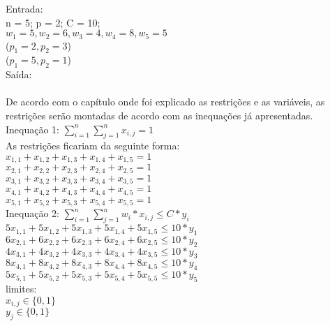     \noindent Entrada:\\
      \indent n = 5; p = 2; C = 10;\\
      \indent \(w_{1} = 5, w_{2} = 6, w_{3} = 4, w_{4} = 8, w_{5} = 5\)\\
      \indent (\(p_{1} = 2, p_{2} = 3\))\\
      \indent (\(p_{1} = 5, p_{2} = 1\))\\
    \noindent Saída:\\
        \\

       De acordo com o capítulo onde foi explicado as restrições e as variáveis, as restrições serão montadas de acordo com as inequações já apresentadas. \\

      \noindent Inequação 1: \( \sum_{i=1}^{n} \sum_{j=1}^{n} x_{i,j} = 1\) \\
        \noindent As restrições ficariam da seguinte forma:\\
        \indent \( x_{1,1} + x_{1,2} + x_{1,3} + x_{1,4} + x_{1,5} = 1 \)\\
        \indent \( x_{2,1} + x_{2,2} + x_{2,3} + x_{2,4} + x_{2,5} = 1\)\\
        \indent \( x_{3,1} + x_{3,2} + x_{3,3} + x_{3,4} + x_{3,5} = 1 \)\\
        \indent \( x_{4,1} + x_{4,2} + x_{4,3} + x_{4,4} + x_{4,5} = 1 \)\\
        \indent \( x_{5,1} + x_{5,2} + x_{5,3} + x_{5,4} + x_{5,5} = 1 \)\\

      \noindent Inequação 2: \( \sum_{i=1}^{n} \sum_{j=1}^{n} w_{i}*x_{i,j} \leq C*y_{i}\) \\
        \indent \( 5x_{1,1} + 5x_{1,2} + 5x_{1,3} + 5x_{1,4} + 5x_{1,5} \leq 10*y_{1} \)\\
        \indent \( 6x_{2,1} + 6x_{2,2} + 6x_{2,3} + 6x_{2,4} + 6x_{2,5} \leq 10*y_{2} \)\\
        \indent \( 4x_{3,1} + 4x_{3,2} + 4x_{3,3} + 4x_{3,4} + 4x_{3,5} \leq 10*y_{3} \)\\
        \indent \( 8x_{4,1} + 8x_{4,2} + 8x_{4,3} + 8x_{4,4} + 8x_{4,5} \leq 10*y_{4} \)\\
        \indent \( 5x_{5,1} + 5x_{5,2} + 5x_{5,3} + 5x_{5,4} + 5x_{5,5} \leq 10*y_{5} \)\\

      \noindent limites: \\
        \indent \( x_{i,j} \in \{0,1\}\) \\
        \indent \( y_{j} \in \{0,1\}\) \\
       
